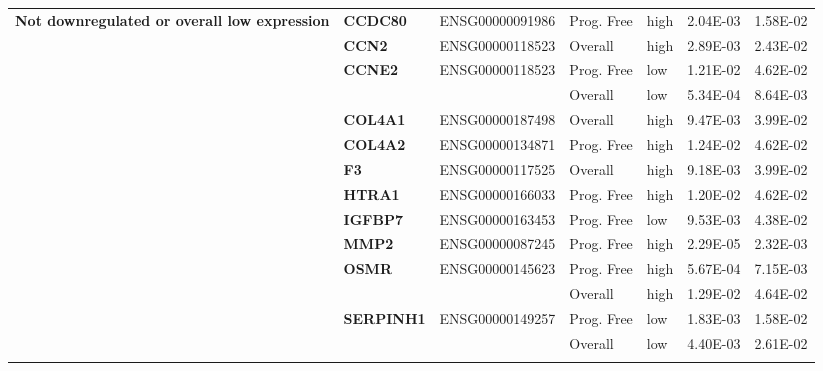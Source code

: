 {\begin{longtable}{|>{\bfseries}p{3cm}|>{\bfseries}p{1.9cm}|p{3cm}|p{2cm}|p{2cm}|p{1.5cm}|p{1.5cm}|}
        Not downregulated or overall low expression             & CCDC80   & ENSG00000091986 & Prog. Free & high & 2.04E-03 & 1.58E-02 \\
        \hhline{~------}
                                                                & CCN2     & ENSG00000118523 & Overall    & high & 2.89E-03 & 2.43E-02 \\
        \hhline{~------}
                                                                & CCNE2    & ENSG00000118523 & Prog. Free & low  & 1.21E-02 & 4.62E-02 \\
        \hhline{~~~----}
                                                                &          &                 & Overall    & low  & 5.34E-04 & 8.64E-03 \\
        \hhline{~------}
                                                                & COL4A1   & ENSG00000187498 & Overall    & high & 9.47E-03 & 3.99E-02 \\
        \hhline{~------}
                                                                & COL4A2   & ENSG00000134871 & Prog. Free & high & 1.24E-02 & 4.62E-02 \\
        \hhline{~------}
                                                                & F3       & ENSG00000117525 & Overall    & high & 9.18E-03 & 3.99E-02 \\
        \hhline{~------}
                                                                & HTRA1    & ENSG00000166033 & Prog. Free & high & 1.20E-02 & 4.62E-02 \\
        \hhline{~------}
                                                                & IGFBP7   & ENSG00000163453 & Prog. Free & low  & 9.53E-03 & 4.38E-02 \\
        \hhline{~------}
                                                                & MMP2     & ENSG00000087245 & Prog. Free & high & 2.29E-05 & 2.32E-03 \\
        \hhline{~------}
                                                                & OSMR     & ENSG00000145623 & Prog. Free & high & 5.67E-04 & 7.15E-03 \\
        \hhline{~~~----}
                                                                &          &                 & Overall    & high & 1.29E-02 & 4.64E-02 \\
        \hhline{~------}
                                                                & SERPINH1 & ENSG00000149257 & Prog. Free & low  & 1.83E-03 & 1.58E-02 \\
        \hhline{~~~----}
                                                                &          &                 & Overall    & low  & 4.40E-03 & 2.61E-02 \\
        \hhline{~------}


\end{longtable}}
